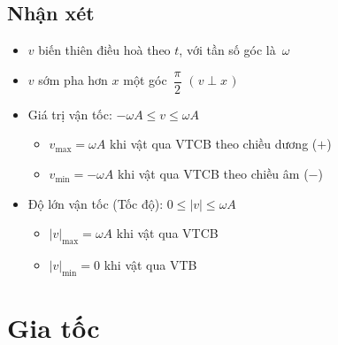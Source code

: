\documentclass[12pt]{article}
\begin{document}
		\subsection{Nhận xét}
			\vspace{5pt}
			\begin{itemize}
				\item \(v\) biến thiên điều hoà theo \(t\), với tần số góc là \(\,\omega\)
				\item \(v\) sớm pha hơn \(x\) một góc \( \, \dfrac{\pi}{2}\) \: \( \left( \hspace{1pt} v \perp x \hspace{1pt} \right) \)
				\item Giá trị vận tốc: \quad \( -\omega A \leq v \leq \omega A \)
					\begin{itemize}[label=\textopenbullet]
						\item \( v_\text{max} = \omega A \) khi vật qua VTCB theo chiều dương (\(+\))
						\item \( v_\text{min} = -\omega A \) khi vật qua VTCB theo chiều âm (\(-\))
					\end{itemize}
				\vspace{1pt}
				\item Độ lớn vận tốc (Tốc độ): \quad \( 0 \leq \lvert v \rvert \leq \omega A \)
					\begin{itemize}[label=\textopenbullet]
						\item \( {\lvert v \rvert}_\text{max} = \omega A \) khi vật qua VTCB
						\item \( {\lvert v \rvert}_\text{min} = 0 \) khi vật qua VTB
					\end{itemize}
			\end{itemize}

	\newpage
	\section{Gia tốc}
\end{document}
